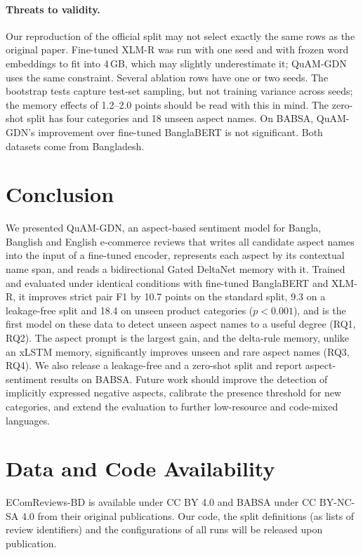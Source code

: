 \documentclass[11pt]{article}
\newcommand{\quam}{QuAM-GDN}
\begin{document}
\paragraph{Threats to validity.}
Our reproduction of the official split may not select exactly the same rows as the original paper.
Fine-tuned XLM-R was run with one seed and with frozen word embeddings to fit into 4\,GB, which may
slightly underestimate it; \quam{} uses the same constraint. Several ablation rows have one or two seeds.
The bootstrap tests capture test-set sampling, but not training variance across seeds; the memory
effects of 1.2--2.0 points should be read with this in mind. The zero-shot split has four categories and
18 unseen aspect names. On BABSA, \quam{}'s improvement over fine-tuned BanglaBERT is not significant.
Both datasets come from Bangladesh.

\section{Conclusion}
\label{sec:conclusion}

We presented \quam{}, an aspect-based sentiment model for Bangla, Banglish and English e-commerce
reviews that writes all candidate aspect names into the input of a fine-tuned encoder, represents each
aspect by its contextual name span, and reads a bidirectional Gated DeltaNet memory with it. Trained and
evaluated under identical conditions with fine-tuned BanglaBERT and XLM-R, it improves strict pair F1 by
10.7 points on the standard split, 9.3 on a leakage-free split and 18.4 on unseen product categories
($p<0.001$), and is the first model on these data to detect unseen aspect names to a useful degree
(RQ1, RQ2). The aspect prompt is the largest gain, and the delta-rule memory, unlike an xLSTM memory,
significantly improves unseen and rare aspect names (RQ3, RQ4). We also release a leakage-free and a
zero-shot split and report aspect-sentiment results on BABSA. Future work should improve the detection
of implicitly expressed negative aspects, calibrate the presence threshold for new categories, and
extend the evaluation to further low-resource and code-mixed languages.

\section*{Data and Code Availability}
EComReviews-BD is available under CC BY 4.0 and BABSA under CC BY-NC-SA 4.0 from their original
publications. Our code, the split definitions (as lists of review identifiers) and the configurations
of all runs will be released upon publication.
\end{document}
